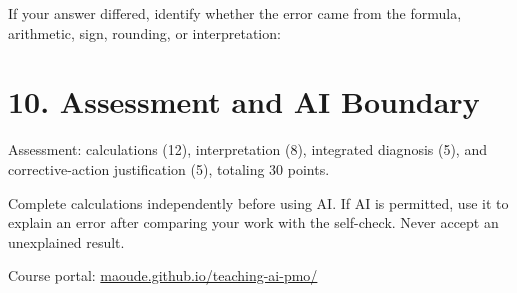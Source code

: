 \documentclass[11pt,a4paper]{article}
\begin{document}
If your answer differed, identify whether the error came from the formula, arithmetic, sign, rounding, or interpretation:

\vspace{8mm}\blankline

\section{10. Assessment and AI Boundary}

Assessment: calculations (12), interpretation (8), integrated diagnosis (5), and corrective-action justification (5), totaling 30 points.

Complete calculations independently before using AI. If AI is permitted, use it to explain an error after comparing your work with the self-check. Never accept an unexplained result.

\vfill
\begin{center}\small\color{pmoTeal}Course portal: \href{https://maoude.github.io/teaching-ai-pmo/}{maoude.github.io/teaching-ai-pmo/}\end{center}
\end{document}
